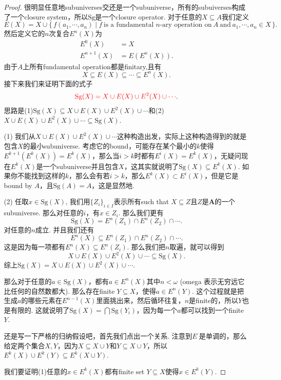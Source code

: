 \documentclass{article}
\newcommand\Set[2]{\{\,#1\mid#2\,\}} %
\newcommand\Sg{\text{Sg}}
\begin{document}
\begin{proof}
很明显任意地subuniverses交还是一个subuniverse，所有的subuiverses构成了一个closure system，所以$\Sg$是一个closure operator. 对于任意的$X \subseteq A$我们定义
$$
E(X) = X \cup \Set{f(a_1,\cdots,a_n)}{f\ \text{is a fundamental $n$-ary operation on}\ A\ \text{and}\ a_1,\cdots,a_n \in X}. 
$$
然后定义它的$n$次复合$E^n(X)$为
$$
\begin{aligned}
E^0(X) &= X \\
E^{n+1}(X) &= E(E^n(X)).
\end{aligned}
$$
由于$A$上所有fundamental operation都是finitary,且有
$$
X \subseteq E(X) \subseteq \cdots \subseteq E^n(X).
$$
接下来我们来证明下面的式子
$$
{\color{red} \Sg(X) = X \cup E(X) \cup E^2(X) \cup \cdots}.
$$
思路是(1)$\Sg(X) \subseteq X \cup E(X) \cup E^2(X) \cup \cdots$和(2)$X \cup E(X) \cup E^2(X) \cup \cdots \subseteq \Sg(X)$. 

(1) 我们从$X \cup E(X) \cup E^2(X) \cup \cdots$这种构造出发，实际上这种构造得到的就是包含$X$的最小subuniverse. 考虑它的bound，可能存在某个最小的$k$使得$E^{k+1}(E^k(X)) = E^k(X)$，那么当$i > k$时都有$E^i(X) = E^k(X)$，无疑问现在$E^k(X)$是一个subuniverse并且包含$X$，这其实就说明了$\Sg(X) \subseteq E^k(X)$. 如果你不能找到这样的$k$，那么会有若$i>k$，那么$E^k(X) \subset E^i(X)$，但是它是bound by $A$，且$\Sg(A) = A$，这是显然地.

(2) 任取$x \in \Sg(X)$, 我们用$\{Z_i\}_{i \in I}$表示所有such that $X \subseteq Z$且$Z$是$\mathbf{A}$的一个subuniverse. 那么对任意的$i$，有$x \in Z_i$. 那么我们更有
$$
\Sg(X) = E^n(Z_1) \cap E^n(Z_2) \cap \cdots.
$$
对任意的$n$成立. 并且我们还有
$$
E^n(X) \subseteq E^n(Z_1) \cap E^n(Z_2) \cap \cdots.
$$
这是因为每一项都有$E^n(X) \subseteq E^n(Z_i)$. 那么我们把$n$取遍，就可以得到
$$
X \cup E(X) \cup E^2(X) \cup \cdots \subseteq \Sg(X).
$$
综上$\Sg(X) = X \cup E(X) \cup E^2(X) \cup \cdots.$

那么对于任意的$a \in \Sg(X)$，都有$a \in E^n(X)$其中$n < \omega$ (omega 表示无穷远它比任何的自然数都大). 那么存在finite $Y \subseteq X$，使得$a \in E^n(Y)$. 这个过程就是把生成$a$的哪些元素在$E^{n-1}(X)$里面挑出来，然后循环往复，$n$是finite的，所以$Y$也是有限的. 这就说明了$\Sg(X) = \bigcap \Sg(Y_i)$，因为每一个$a$都可以找到一个finite $Y$.

还是写一下严格的归纳假设吧，首先我们点出一个关系. 注意到$E^{\cdot}$是单调的，那么给定两个集合$X,Y$，因为$X \subseteq X \cup Y$和$Y \subseteq X \cup Y$，所以$E^k(X) \cup E^k(Y) \subseteq E^k(X \cup Y)$.

我们要证明(1)任意的$x \in E^k(X)$都有finite set $Y \subseteq X$使得$x \in E^k(Y)$.


\end{proof}
\end{document}
